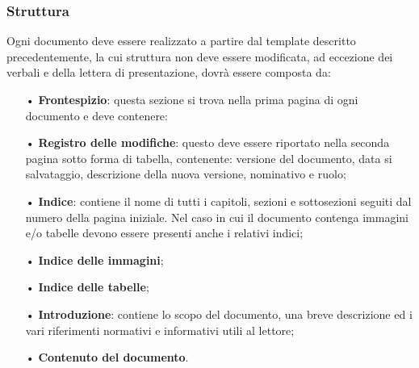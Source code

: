\subsubsection{Struttura}
Ogni documento deve essere realizzato a partire dal template descritto precedentemente, la cui struttura non deve essere modificata, ad eccezione dei verbali e della lettera di presentazione, dovrà essere composta da:
\begin{itemize}
\item[•] \textbf{Frontespizio}: questa sezione si trova nella prima pagina di ogni documento e deve contenere:
\item[•] \textbf{Registro delle modifiche}: questo deve essere riportato nella seconda pagina sotto forma di tabella, contenente: versione del documento, data si salvataggio, descrizione della nuova versione, nominativo e ruolo;
\item[•] \textbf{Indice}: contiene il nome di tutti i capitoli, sezioni e sottosezioni seguiti dal numero della pagina iniziale. Nel caso in cui il documento contenga immagini e/o tabelle devono essere presenti anche i relativi indici;
\item[•] \textbf{Indice delle immagini};
\item[•] \textbf{Indice delle tabelle};
\item[•] \textbf{Introduzione}: contiene lo scopo del documento, una breve descrizione ed i vari riferimenti normativi e informativi utili al lettore;
\item[•] \textbf{Contenuto del documento}.
\end{itemize}

